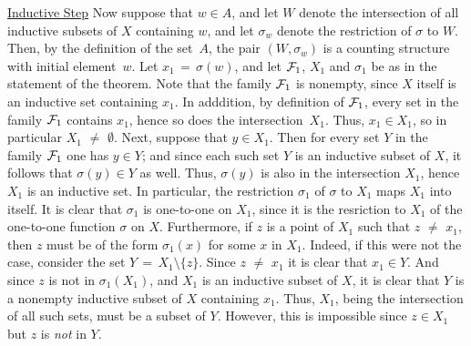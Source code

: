         \underline{Inductive Step} Now suppose that $w{\in}A$, and let $W$ denote the intersection of all inductive subsets of $X$ containing $w$,
    and let ${\sigma}_{w}$ denote the restriction of ${\sigma}$ to $W$. Then, by the definition of the set~$A$,
    the pair $(W,{\sigma}_{w})$ is a counting structure with initial element~$w$.
    Let $x_{1} \,=\, {\sigma}(w)$, and let ${\cal F}_{1}$, $X_{1}$ and ${\sigma}_{1}$ be as in the statement of the theorem.
    Note that the family ${\cal F}_{1}$ is nonempty, since $X$ itself is an inductive set containing $x_{1}$.
    In adddition, by definition of ${\cal F}_{1}$, every set in the family ${\cal F}_{1}$ contains $x_{1}$, hence so does the intersection~$X_{1}$.
    Thus, $x_{1}{\in}X_{1}$, so in particular $X_{1} \,\,{\neq}\,\, {\emptyset}$.
    Next, suppose that $y{\in}X_{1}$. Then for every set $Y$ in the family ${\cal F}_{1}$ one has $y{\in}Y$;
    and since each such set $Y$ is an inductive subset of $X$, it follows that ${\sigma}(y){\in}Y$ as well.
    Thus, ${\sigma}(y)$ is also in the intersection $X_{1}$, hence $X_{1}$ is an inductive set.
    In particular, the restriction ${\sigma}_{1}$ of ${\sigma}$ to $X_{1}$ maps $X_{1}$ into itself.
    It is clear that ${\sigma}_{1}$ is one-to-one on $X_{1}$, since it is the resriction to $X_{1}$ of the one-to-one function ${\sigma}$ on $X$.
    Furthermore, if $z$ is a point of $X_{1}$ such that $z \,\,{\neq}\,\, x_{1}$, then $z$ must be of the form ${\sigma}_{1}(x)$ for some $x$ in $X_{1}$.
    Indeed, if this were not the case, consider the set $Y \,=\, X_{1}{\setminus}\{z\}$.
    Since $z \,\,{\neq}\,\, x_{1}$ it is clear that $x_{1}{\in}Y$.
    And since $z$ is not in ${\sigma}_{1}(X_{1})$, and $X_{1}$ is an inductive subset of $X$,
    it is clear that $Y$ is a nonempty inductive subset of $X$ containing $x_{1}$.
    Thus, $X_{1}$, being the intersection of all such sets, must be a subset of $Y$.
    However, this is impossible since $z{\in}X_{1}$ but $z$ is {\em not} in $Y$.

